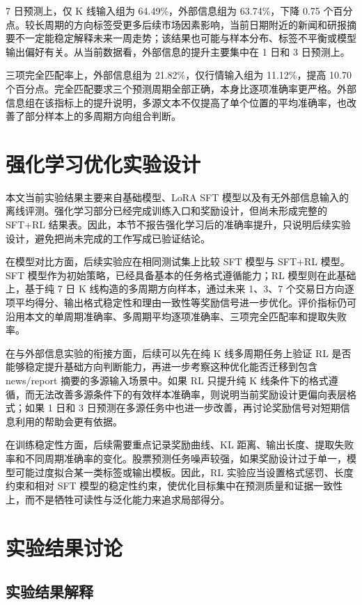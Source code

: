 7 日预测上，仅 K 线输入组为 64.49\%，外部信息组为 63.74\%，下降 0.75 个百分点。较长周期的方向标签受更多后续市场因素影响，当前日期附近的新闻和研报摘要不一定能稳定解释未来一周走势；该结果也可能与样本分布、标签不平衡或模型输出偏好有关。从当前数据看，外部信息的提升主要集中在 1 日和 3 日预测上。

三项完全匹配率上，外部信息组为 21.82\%，仅行情输入组为 11.12\%，提高 10.70 个百分点。完全匹配要求三个预测周期全部正确，本身比逐项准确率更严格。外部信息组在该指标上的提升说明，多源文本不仅提高了单个位置的平均准确率，也改善了部分样本上的多周期方向组合判断。

\section{强化学习优化实验设计}

本文当前实验结果主要来自基础模型、LoRA SFT 模型以及有无外部信息输入的离线评测。强化学习部分已经完成训练入口和奖励设计，但尚未形成完整的 SFT+RL 结果表。因此，本节不报告强化学习后的准确率提升，只说明后续实验设计，避免把尚未完成的工作写成已验证结论。

在模型对比方面，后续实验应在相同测试集上比较 SFT 模型与 SFT+RL 模型。SFT 模型作为初始策略，已经具备基本的任务格式遵循能力；RL 模型则在此基础上，基于纯 7 日 K 线构造的多周期方向样本，通过未来 1、3、7 个交易日方向逐项平均得分、输出格式稳定性和理由一致性等奖励信号进一步优化。评价指标仍可沿用本文的单周期准确率、多周期平均逐项准确率、三项完全匹配率和提取失败率。

在与外部信息实验的衔接方面，后续可以先在纯 K 线多周期任务上验证 RL 是否能够稳定提升基础方向判断能力，再进一步考察这种优化能否迁移到包含 news/report 摘要的多源输入场景中。如果 RL 只提升纯 K 线条件下的格式遵循，而无法改善多源条件下的有效样本准确率，则说明当前奖励设计更偏向表层格式；如果 1 日和 3 日预测在多源任务中也进一步改善，再讨论奖励信号对短期信息利用的帮助会更有依据。

在训练稳定性方面，后续需要重点记录奖励曲线、KL 距离、输出长度、提取失败率和不同周期准确率的变化。股票预测任务噪声较强，如果奖励设计过于单一，模型可能过度拟合某一类标签或输出模板。因此，RL 实验应当设置格式惩罚、长度约束和相对 SFT 模型的稳定性约束，使优化目标集中在预测质量和证据一致性上，而不是牺牲可读性与泛化能力来追求局部得分。

\section{实验结果讨论}

\subsection{实验结果解释}

